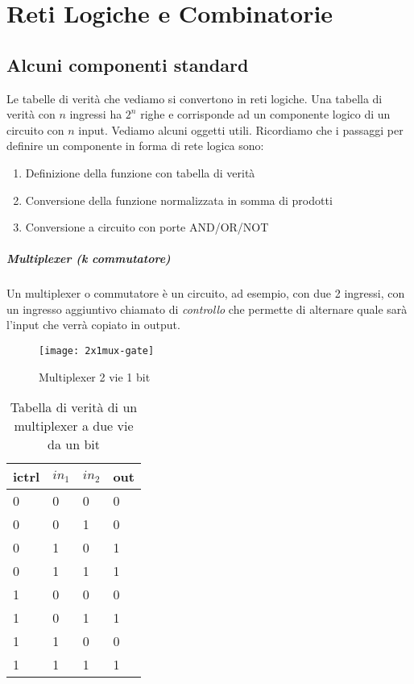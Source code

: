 \chapter{Reti Logiche e Combinatorie} 

\section{Alcuni componenti standard}

Le tabelle di verità che vediamo si convertono in reti logiche. Una tabella di verità con $ n $ ingressi ha $ 2^n $ righe e corrisponde ad un componente logico di un circuito con $ n $ input. Vediamo alcuni oggetti utili. Ricordiamo che i passaggi per definire un componente in forma di rete logica sono: 

\begin{enumerate}
	\item Definizione della funzione con tabella di verità
	\item Conversione della funzione normalizzata in somma di prodotti
	\item Conversione a circuito con porte AND/OR/NOT
\end{enumerate}

\paragraph{Multiplexer (k commutatore)}
Un multiplexer o commutatore è un circuito, ad esempio, con due 2 ingressi, con un ingresso aggiuntivo chiamato di \textit{controllo} che permette di alternare quale sarà l'input che verrà copiato in output.

\begin{figure}[H]
	\centering
	\texttt{[image: 2x1mux-gate]}
	\caption{Multiplexer 2 vie 1 bit}
\end{figure}

\begin{table}[H]
	\centering
	\caption{Tabella di verità di un multiplexer a due vie da un bit}
	\label{tab:multiplexer1}
	\begin{tabular}{|lll|l|}
		\hline
		ictrl & $ in_1 $ & $ in_2 $ & out \\ \hline
		0     & 0   & 0   & 0   \\
		0     & 0   & 1   & 0   \\
		0     & 1   & 0   & 1   \\
		0     & 1   & 1   & 1   \\ \hline
		1     & 0   & 0   & 0   \\
		1     & 0   & 1   & 1   \\
		1     & 1   & 0   & 0   \\
		1     & 1   & 1   & 1   \\ \hline
	\end{tabular}
\end{table}

